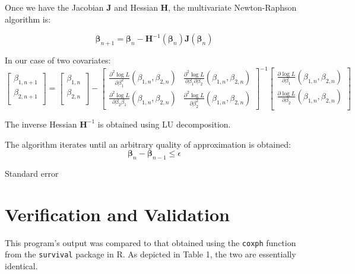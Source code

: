 \documentclass{article}
\begin{document}
Once we have the Jacobian $\bm{J}$ and Hessian $\bm{H}$, the multivariate
Newton-Raphson algorithm is:

\begin{equation}
	\bm{\beta}_{n+1} = \bm{\beta}_n -
	\bm{H}^{-1}(\bm{\beta}_n)\bm{J}(\bm{\beta}_n)
\end{equation}

In our case of two covariates:
\begin{equation}
	\begin{bmatrix}
		\beta_{1, n+1} \\
		\beta_{2, n+1} \\
	\end{bmatrix}
	=
	\begin{bmatrix}
		\beta_{1, n} \\
		\beta_{2, n} \\
	\end{bmatrix}
	-
	\begin{bmatrix}
		\frac{\partial^2 \log L}{\partial \beta_1^2}\left( \beta_{1,
		n}, \beta_{2, n} \right) &

		\frac{\partial^2 \log L}{\partial \beta_1 \partial \beta_2}\left( \beta_{1,
		n}, \beta_{2, n} \right) 
		
		\\

		\frac{\partial^2 \log L}{\partial \beta_2 \beta_1}\left( \beta_{1,
		n}, \beta_{2, n} \right) &

		\frac{\partial^2 \log L}{\partial \beta_2^2}\left( \beta_{1,
		n}, \beta_{2, n} \right) 
	\end{bmatrix}^{-1}
	\begin{bmatrix}
		\frac{\partial \log L}{\partial \beta_1}\left( \beta_{1, n},
		\beta_{2, n}\right) \\
		\frac{\partial \log L}{\partial \beta_2} \left( \beta_{1, n},
		\beta_{2, n} \right)\\
	\end{bmatrix}
\end{equation}

The inverse Hessian $\bm{H}^{-1}$ is obtained using LU decomposition.

The algorithm iterates until an arbitrary quality of approximation is obtained:
\begin{equation}
	\bm{\beta}_{n} - \bm{\beta}_{n-1} \leq \epsilon
\end{equation}

Standard error

\section*{Verification and Validation}
This program's output was compared to that obtained using
the \texttt{coxph} function from the \texttt{survival} package in R. As depicted
in Table 1, the two are essentially identical.
\end{document}
